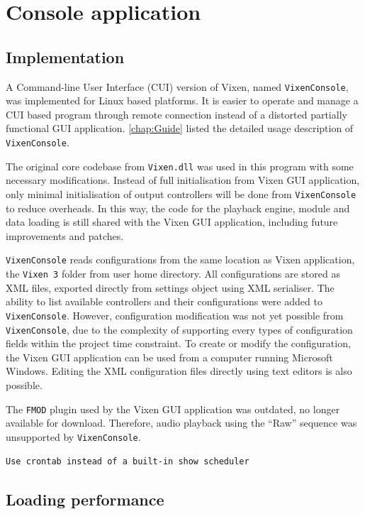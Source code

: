 \chapter{Console application}
\renewcommand{\baselinestretch}{\mystretch}
\label{chap:Console}

\section{Implementation}

A Command-line User Interface (CUI) version of Vixen, named \texttt{VixenConsole}, was implemented for Linux based platforms. It is easier to operate and manage a CUI based program through remote connection instead of a distorted partially functional GUI application. \cref{chap:Guide} listed the detailed usage description of \texttt{VixenConsole}.

The original core codebase from \texttt{Vixen.dll} was used in this program with some necessary modifications. Instead of full initialisation from Vixen GUI application, only minimal initialisation of output controllers will be done from \texttt{VixenConsole} to reduce overheads. In this way, the code for the playback engine, module and data loading is still shared with the Vixen GUI application, including future improvements and patches.

\texttt{VixenConsole} reads configurations from the same location as Vixen application, the \texttt{Vixen 3} folder from user home directory. All configurations are stored as XML files, exported directly from settings object using XML serialiser. The ability to list available controllers and their configurations were added to \texttt{VixenConsole}. However, configuration modification was not yet possible from \texttt{VixenConsole}, due to the complexity of supporting every types of configuration fields within the project time constraint. To create or modify the configuration, the Vixen GUI application can be used from a computer running Microsoft Windows. Editing the XML configuration files directly using text editors is also possible.

The \texttt{FMOD} plugin used by the Vixen GUI application was outdated, no longer available for download. Therefore, audio playback using the ``Raw'' sequence was unsupported by \texttt{VixenConsole}.

\texttt{Use crontab instead of a built-in show scheduler}

\section{Loading performance}

